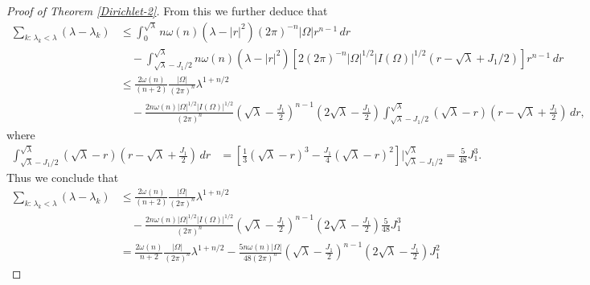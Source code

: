 \documentclass[11pt,twoside, leqno]{article}
\numberwithin{equation}{section}
\begin{document}
\begin{proof}[Proof of Theorem \ref{Dirichlet-2}]
From this  we further deduce that
\begin{align*}
\sum_{k:\,\lambda_k<\lambda}(\lambda-\lambda_k)&\le  \int_0^{\sqrt\lambda} n\omega(n)(\lambda-|r|^2)(2\pi)^{-n}|\Omega| r^{n-1} \,dr\nonumber\\
 &\quad-  \int_{\sqrt\lambda-J_1/2}^{\sqrt\lambda} n\omega(n)(\lambda-|r|^2)\left[2(2\pi)^{-n}|\Omega|^{1/2}|I(\Omega)|^{1/2}(r-\sqrt\lambda+J_1/2)\right] r^{n-1} \,dr\\
 &\le \frac{ 2\omega(n)}{(n+2)} \frac{|\Omega|}{(2\pi)^{n}}\lambda^{1+n/2}\\
 &\quad-\frac{2 n\omega(n)|\Omega|^{1/2}|I(\Omega)|^{1/2}}{(2\pi)^{n}}(\sqrt\lambda-\frac{J_1}2)^{n-1}(2\sqrt\lambda-\frac{J_1}{2})
 \int_{\sqrt\lambda-J_1/2}^{\sqrt\lambda} (\sqrt\lambda-r)(r-\sqrt\lambda +\frac{J_1}2)\,dr,
\end{align*}
where
\begin{align*}
\int_{\sqrt\lambda-J_1/2}^{\sqrt\lambda} (\sqrt\lambda-r)(r-\sqrt\lambda +\frac{J_1}2)\,dr&
= \left[\frac{1}{3} (\sqrt\lambda-r)^3-\frac{J_1}4  (\sqrt\lambda-r)^2\right]\bigg|_{\sqrt\lambda-J_1/2}^{\sqrt\lambda}
=\frac{5}{48}J_1^3.
\end{align*}
Thus we conclude that
\begin{align*}
\sum_{k:\,\lambda_k<\lambda}(\lambda-\lambda_k)&\le \frac{ 2\omega(n)}{(n+2)} \frac{|\Omega|}{(2\pi)^{n}}\lambda^{1+n/2}\\
 &\quad-\frac{2 n\omega(n)|\Omega|^{1/2}|I(\Omega)|^{1/2}}{(2\pi)^{n}}(\sqrt\lambda-\frac{J_1}2)^{n-1}(2\sqrt\lambda-\frac{J_1}{2})
 \frac{5}{48}J_1^3\\
 &=  \frac{ 2\omega(n)}{n+2} \frac{|\Omega|}{(2\pi)^{n}}\lambda^{1+n/2}-\frac{ 5n\omega(n)|\Omega|}{48(2\pi)^{n}}(\sqrt\lambda-\frac{J_1}2)^{n-1}(2\sqrt\lambda-\frac{J_1}{2})J_1^2
\end{align*}


\end{proof}
\end{document}
